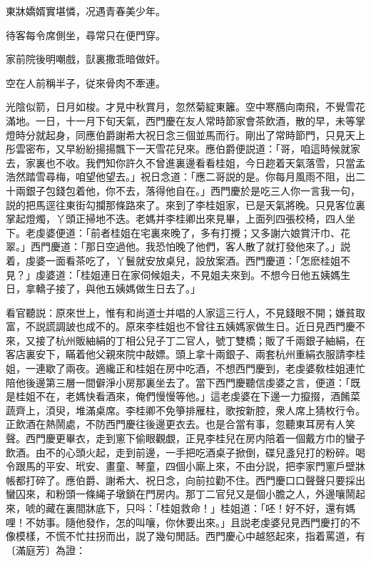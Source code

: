 \begin{myquote}
東牀嬌婿實堪憐，况遇青春美少年。

待客每令席側坐，尋常只在便門穿。

家前院後明嘲戲，獃裏撒乖暗做奸。

空在人前稱半子，従來骨肉不牽連。
\end{myquote}

光陰似箭，日月如梭。才見中秋賞月，忽然菊綻東籬。空中寒鴈向南飛，不覺雪花滿地。一日，十一月下旬天氣，西門慶在友人常時節家會茶飲酒，散的早，未等掌燈時分就起身，同應伯爵謝希大祝日念三個並馬而行。剛出了常時節門，只見天上彤雲密布，又早紛紛揚揚飄下一天雪花兒來。應伯爵便説道：「哥，咱這時候就家去，家裏也不收。我們知你許久不曾進裏邊看看桂姐，今日趂着天氣落雪，只當孟浩然踏雪尋梅，咱望他望去。」祝日念道：「應二哥説的是。你每月風雨不阻，出二十兩銀子包錢包着他，你不去，落得他自在。」西門慶於是吃三人你一言我一句，説的把馬逕往東街勾攔那條路來了。來到了李桂姐家，已是天氣將晚。只見客位裏掌起燈燭，丫頭正掃地不迭。老媽并李桂卿出來見畢，上面列四張校椅，四人坐下。老虔婆便道：「前者桂姐在宅裏來晚了，多有打攪；又多謝六娘賞汗巾、花翠。」西門慶道：「那日空過他。我恐怕晚了他們，客人散了就打發他來了。」説着，虔婆一面看茶吃了，丫鬟就安放桌兒，設放案酒。西門慶道：「怎麽桂姐不見？」虔婆道：「桂姐連日在家伺候姐夫，不見姐夫來到。不想今日他五姨媽生日，拿轎子接了，與他五姨媽做生日去了。」

看官聽説：原來世上，惟有和尚道士并唱的人家這三行人，不見錢眼不開；嫌貧取富，不説謊調詖也成不的。原來李桂姐也不曾往五姨媽家做生日。近日見西門慶不來，又接了杭州販紬絹的丁相公兒子丁二官人，號丁雙橋；販了千兩銀子紬絹，在客店裏安下，瞞着他父親來院中敲嫖。頭上拿十兩銀子、兩套杭州重絹衣服請李桂姐，一連歇了兩夜。適纔正和桂姐在房中吃酒，不想西門慶到，老虔婆敎桂姐連忙陪他後邊第三層一間僻淨小房那裏坐去了。當下西門慶聽信虔婆之言，便道：「既是桂姐不在，老媽快看酒來，俺們慢慢等他。」這老虔婆在下邊一力攛掇，酒餚菜蔬齊上，湏臾，堆滿桌席。李桂卿不免箏排雁柱，歌按新腔，衆人席上猜枚行令。正飲酒在熱鬧處，不防西門慶往後邊更衣去。也是合當有事，忽聽東耳房有人笑聲。西門慶更畢衣，走到窻下偷眼觀覷，正見李桂兒在房内陪着一個戴方巾的蠻子飲酒。由不的心頭火起，走到前邊，一手把吃酒桌子掀倒，碟兒盞兒打的粉碎。喝令跟馬的平安、玳安、畫童、琴童，四個小廝上來，不由分説，把李家門窻戶壁牀帳都打碎了。應伯爵、謝希大、祝日念，向前拉勸不住。西門慶口口聲聲只要採出蠻囚來，和粉頭一條䋲子墩鎖在門房内。那丁二官兒又是個小膽之人，外邊嚷鬧起來，唬的藏在裏間牀底下，只呌：「桂姐救命！」桂姐道：「呸！好不好，還有媽哩！不妨事。隨他發作，怎的叫嚷，你休要出來。」且説老虔婆兒見西門慶打的不像模樣，不慌不忙拄拐而出，説了幾句閒話。西門慶心中越怒起來，指着罵道，有〔滿庭芳〕為證：

